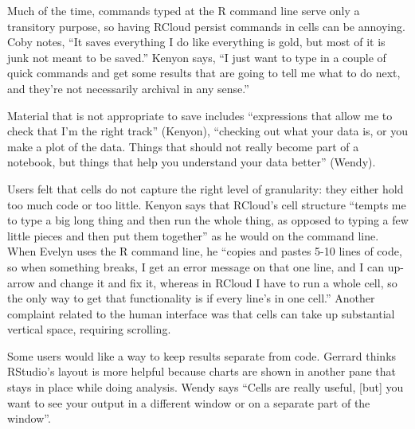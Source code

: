 
Much of the time, commands typed at the R command line serve only a transitory
purpose, so having RCloud persist commands in cells can be annoying.
Coby notes, ``It saves everything I do like everything is gold, but most
of it is junk not meant to be saved.'' Kenyon says, ``I just want to type in a
couple of quick commands and get some results that are going to tell
me what to do next, and they're not necessarily archival in any sense.''

Material that is not appropriate to save includes ``expressions that allow
me to check that I'm the right track'' (Kenyon), ``checking out what your data is,
or you make a plot of the data. Things that should not really become part of a
notebook, but things that help you understand your data better'' (Wendy).

Users felt that cells do not capture the right level of granularity: they
either hold too much code or too little. Kenyon says that RCloud's cell structure
``tempts me to type a big long thing and then run the whole thing, as opposed to
typing a few little pieces and then put them together'' as he would on the command line.
When Evelyn uses the R command line, he ``copies and pastes 5-10 lines of code,
so when something breaks, I get an error message on that one line, and I can
up-arrow and change it and fix it, whereas in RCloud I have to run a whole cell,
so the only way to get that functionality is if every line's in one cell.''
Another complaint related to the human interface was that cells can take up
substantial vertical space, requiring scrolling.

Some users would like a way to keep results separate from code.
Gerrard thinks RStudio's layout is more helpful because charts
are shown in another pane that stays in place while doing analysis. Wendy says
``Cells are really useful, [but] you want to see your output in a different
window or on a separate part of the window''.

